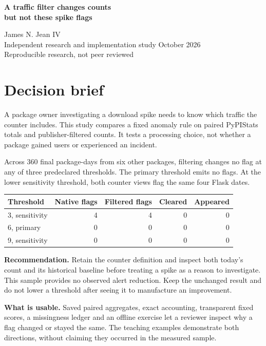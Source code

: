 \documentclass[11pt]{article}
\newcommand{\MFinalOrigins}{360}
\newcommand{\MThreeNative}{4}
\newcommand{\MThreeFiltered}{4}
\newcommand{\MThreeCleared}{0}
\newcommand{\MThreeAppeared}{0}
\newcommand{\MSixNative}{0}
\newcommand{\MSixFiltered}{0}
\newcommand{\MSixCleared}{0}
\newcommand{\MSixAppeared}{0}
\newcommand{\MNineNative}{0}
\newcommand{\MNineFiltered}{0}
\newcommand{\MNineCleared}{0}
\newcommand{\MNineAppeared}{0}
\begin{document}
\begin{center}
{\LARGE\bfseries A traffic filter changes counts\\but not these spike flags}\par
\vspace{8pt}James N. Jean IV\\
Independent research and implementation study October 2026\\
{\small Reproducible research, not peer reviewed}
\end{center}
\section*{Decision brief}
A package owner investigating a download spike needs to know which traffic the counter includes. This study compares a fixed anomaly rule on paired PyPIStats totals and publisher-filtered counts. It tests a processing choice, not whether a package gained users or experienced an incident.

Across \MFinalOrigins{} final package-days from six other packages, filtering changes no flag at any of three predeclared thresholds. The primary threshold emits no flags. At the lower sensitivity threshold, both counter views flag the same four Flask dates.

\begin{center}\begin{tabular}{lrrrr}\toprule
Threshold & Native flags & Filtered flags & Cleared & Appeared\\\midrule
3, sensitivity & \MThreeNative & \MThreeFiltered & \MThreeCleared & \MThreeAppeared\\
6, primary & \MSixNative & \MSixFiltered & \MSixCleared & \MSixAppeared\\
9, sensitivity & \MNineNative & \MNineFiltered & \MNineCleared & \MNineAppeared\\\bottomrule
\end{tabular}\end{center}

\textbf{Recommendation.} Retain the counter definition and inspect both today's count and its historical baseline before treating a spike as a reason to investigate. This sample provides no observed alert reduction. Keep the unchanged result and do not lower a threshold after seeing it to manufacture an improvement.

\textbf{What is usable.} Saved paired aggregates, exact accounting, transparent fixed scores, a missingness ledger and an offline exercise let a reviewer inspect why a flag changed or stayed the same. The teaching examples demonstrate both directions, without claiming they occurred in the measured sample.
\end{document}
